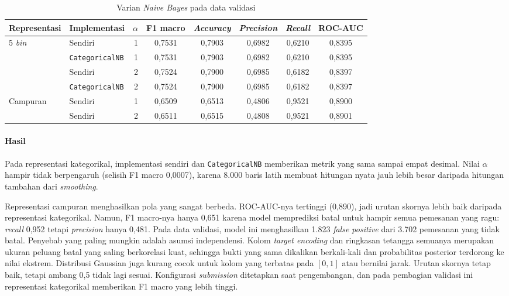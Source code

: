 \begin{table}[H]
    \centering
    \small
    \caption{Varian \textit{Naive Bayes} pada data validasi}
    \label{tab:nb-sklearn}
    \setlength{\tabcolsep}{4pt}
    \begin{tabular}{@{}llrccccc@{}}
        \toprule
        Representasi & Implementasi & $\alpha$ & F1 macro & \textit{Accuracy} & \textit{Precision} & \textit{Recall} & ROC-AUC \\
        \midrule
        5 \textit{bin} & Sendiri & 1 & 0,7531 & 0,7903 & 0,6982 & 0,6210 & 0,8395 \\
         & \texttt{CategoricalNB} & 1 & 0,7531 & 0,7903 & 0,6982 & 0,6210 & 0,8395 \\
         & Sendiri & 2 & 0,7524 & 0,7900 & 0,6985 & 0,6182 & 0,8397 \\
         & \texttt{CategoricalNB} & 2 & 0,7524 & 0,7900 & 0,6985 & 0,6182 & 0,8397 \\
        \midrule
        Campuran & Sendiri & 1 & 0,6509 & 0,6513 & 0,4806 & 0,9521 & 0,8900 \\
         & Sendiri & 2 & 0,6511 & 0,6515 & 0,4808 & 0,9521 & 0,8901 \\
        \bottomrule
    \end{tabular}
\end{table}

\paragraph{Hasil}
Pada representasi kategorikal, implementasi sendiri dan
\texttt{CategoricalNB} memberikan metrik yang sama sampai empat desimal.
Nilai $\alpha$ hampir tidak berpengaruh (selisih F1 macro 0,0007), karena
8.000 baris latih membuat hitungan nyata jauh lebih besar daripada hitungan
tambahan dari \textit{smoothing}.

Representasi campuran menghasilkan pola yang sangat berbeda. ROC-AUC-nya
tertinggi (0,890), jadi urutan skornya lebih baik daripada representasi
kategorikal. Namun, F1 macro-nya hanya 0,651 karena model memprediksi batal
untuk hampir semua pemesanan yang ragu: \textit{recall} 0,952 tetapi
\textit{precision} hanya 0,481. Pada data validasi, model ini menghasilkan
1.823 \textit{false positive} dari 3.702 pemesanan yang tidak batal.
Penyebab yang paling mungkin adalah asumsi independensi. Kolom
\textit{target encoding} dan ringkasan tetangga semuanya merupakan ukuran
peluang batal yang saling berkorelasi kuat, sehingga bukti yang sama
dikalikan berkali-kali dan probabilitas posterior terdorong ke nilai
ekstrem. Distribusi Gaussian juga kurang cocok untuk kolom yang terbatas
pada $[0,1]$ atau bernilai jarak. Urutan skornya tetap baik, tetapi ambang
0,5 tidak lagi sesuai. Konfigurasi \textit{submission} ditetapkan saat
pengembangan, dan pada pembagian validasi ini representasi kategorikal
memberikan F1 macro yang lebih tinggi.


